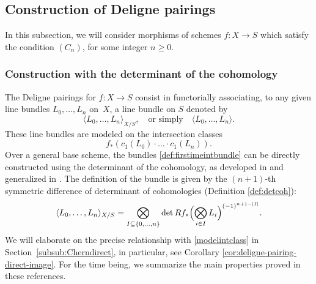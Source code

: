 \documentclass[JEP,XML,SOM,Unicode,published]{cedram}
\theoremstyle{plain}
\theoremstyle{definition}
\begin{document}
\subsection{Construction of Deligne pairings}\label{subsec:Deligne-pairings} In this subsection, we will consider morphisms of schemes $f\colon X \to S$ which satisfy the condition $(C_n)$, for some integer $n\geq 0$.

\subsubsection{Construction with the determinant of the cohomology}

The Deligne pairings for $f\colon X\to S$ consist in functorially associating, to any given line bundles $L_{0},\ldots, L_{n}$ on~$X$, a line bundle on $S$ denoted by
\begin{equation} \label{def:firstimeintbundle}
\langle L_0, \ldots, L_n \rangle_{X/S},\quad\text{or simply}\quad\langle L_0, \ldots, L_n \rangle.
\end{equation}
These line bundles are modeled on the intersection classes
\begin{equation}\label{modelintclass}
f_\ast (c_1(L_0)\cdot \ldots\cdot c_1(L_n) ).
\end{equation}
Over a general base scheme, the bundles \eqref{def:firstimeintbundle} can be directly constructed using the determinant of the cohomology, as developed in \cite{Ducrot} and generalized in \cite[App.]{Boucksom-Eriksson}. The definition of the bundle is given by the $(n+1)$-th symmetric difference of determinant of cohomologies (\cf Definition \ref{def:detcoh}):
\begin{equation}\label{eq:definition-ducrot}
\langle L_0, \ldots, L_n \rangle_{X/S} = \bigotimes_{I \subseteq \{0, \ldots, n \}} \det Rf_* \Bigl( \bigotimes_{i \in I} L_i \Bigr)^{(-1)^{n+1-|I|}}.
\end{equation}
We will elaborate on the precise relationship with \eqref{modelintclass} in Section~\ref{subsub:Cherndirect}, in particular, see Corollary \ref{cor:deligne-pairing-direct-image}. For the time being, we summarize the main properties proved in these references.
\end{document}
